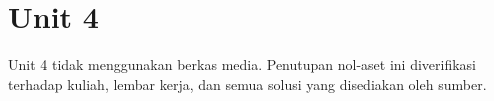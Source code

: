 \section*{Unit 4}
Unit 4 tidak menggunakan berkas media. Penutupan nol-aset ini diverifikasi terhadap kuliah, lembar kerja, dan semua solusi yang disediakan oleh sumber.
